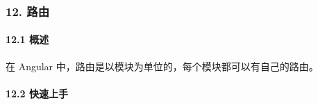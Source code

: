 \documentclass[
]{article}
\begin{document}
\hypertarget{12-ux8defux7531}{%
\subsubsection{12. 路由}\label{12-ux8defux7531}}

\hypertarget{121-ux6982ux8ff0}{%
\paragraph{12.1 概述}\label{121-ux6982ux8ff0}}

在 Angular 中，路由是以模块为单位的，每个模块都可以有自己的路由。

\hypertarget{122-ux5febux901fux4e0aux624b}{%
\paragraph{12.2 快速上手}\label{122-ux5febux901fux4e0aux624b}}
\end{document}
